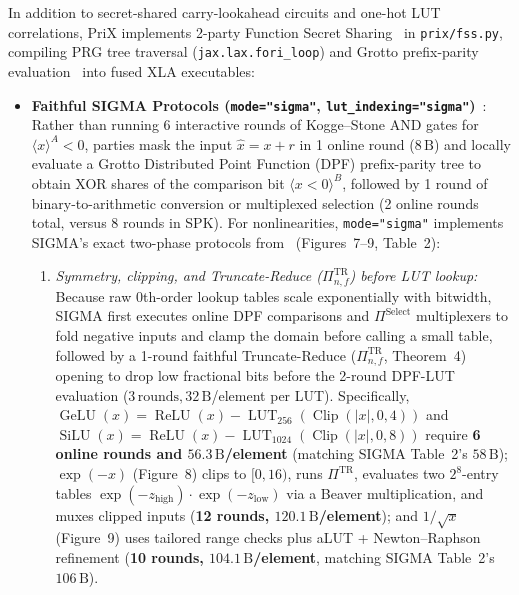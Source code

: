 \documentclass[11pt]{article}
\newcommand{\shareA}[1]{\langle #1 \rangle^{A}}
\newcommand{\shareB}[1]{\langle #1 \rangle^{B}}
\begin{document}
In addition to secret-shared carry-lookahead circuits and one-hot LUT correlations, PriX implements 2-party Function Secret Sharing~\cite{boyle2015function,boyle2016function} in \texttt{prix/fss.py}, compiling PRG tree traversal (\texttt{jax.lax.fori\_loop}) and Grotto prefix-parity evaluation~\cite{storrier2023grotto} into fused XLA executables:
\begin{itemize}
    \item \textbf{Faithful SIGMA Protocols (\texttt{mode="sigma"}, \texttt{lut\_indexing="sigma"})}~\cite{gupta2024sigma}: Rather than running 6 interactive rounds of Kogge--Stone AND gates for $\shareA{x} < 0$, parties mask the input $\hat{x} = x + r$ in 1 online round ($8\,\text{B}$) and locally evaluate a Grotto Distributed Point Function (DPF) prefix-parity tree to obtain XOR shares of the comparison bit $\shareB{x < 0}$, followed by 1 round of binary-to-arithmetic conversion or multiplexed selection (2 online rounds total, versus 8 rounds in SPK). For nonlinearities, \texttt{mode="sigma"} implements SIGMA's exact two-phase protocols from~\cite{gupta2024sigma} (Figures~7--9, Table~2):
    \begin{enumerate}
        \item \emph{Symmetry, clipping, and Truncate-Reduce ($\Pi^{\text{TR}}_{n,f}$) before LUT lookup:} Because raw 0th-order lookup tables scale exponentially with bitwidth, SIGMA first executes online DPF comparisons and $\Pi^{\text{Select}}$ multiplexers to fold negative inputs and clamp the domain before calling a small table, followed by a 1-round faithful Truncate-Reduce ($\Pi^{\text{TR}}_{n,f}$, Theorem~4) opening to drop low fractional bits before the 2-round DPF-LUT evaluation ($3\,\text{rounds}, 32\,\text{B}$/element per LUT). Specifically, $\operatorname{GeLU}(x) = \operatorname{ReLU}(x) - \operatorname{LUT}_{256}(\operatorname{Clip}(|x|, 0, 4))$ and $\operatorname{SiLU}(x) = \operatorname{ReLU}(x) - \operatorname{LUT}_{1024}(\operatorname{Clip}(|x|, 0, 8))$ require \textbf{6 online rounds and $56.3\,\text{B}$/element} (matching SIGMA Table~2's $58\,\text{B}$); $\exp(-x)$ (Figure~8) clips to $[0, 16)$, runs $\Pi^{\text{TR}}$, evaluates two $2^8$-entry tables $\exp(-z_{\text{high}})\cdot\exp(-z_{\text{low}})$ via a Beaver multiplication, and muxes clipped inputs (\textbf{12 rounds, $120.1\,\text{B}$/element}); and $1/\sqrt{x}$ (Figure~9) uses tailored range checks plus aLUT + Newton--Raphson refinement (\textbf{10 rounds, $104.1\,\text{B}$/element}, matching SIGMA Table~2's $106\,\text{B}$).
    \end{enumerate}

\end{itemize}
\end{document}
